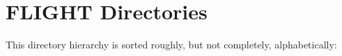 \section{FLIGHT Directories}
This directory hierarchy is sorted roughly, but not completely, alphabetically:\begin{CompactList}
\item {}
\item {}
\end{CompactList}
